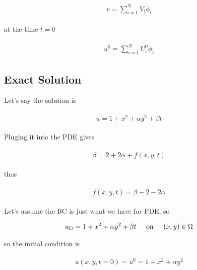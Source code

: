 \documentclass{article}
\begin{document}
	\begin{gather}
	\begin{split}
		v = \sum_{i=1}^{N}V_i\phi_i
	\end{split}
	\end{gather}
	
	at the time $t=0$
	
	\begin{gather}
	\begin{split}
	u^0 = \sum_{i=1}^{N}U^0_i\phi_i
	\end{split}
	\end{gather}
	
	
	
	\subsection*{Exact Solution}
	
	Let's say the solution is
	
	\begin{gather}
	\begin{split}
	u = 1 + x^2 + \alpha y^2 + \beta t
	\end{split}
	\end{gather}
	
	Pluging it into the PDE gives
	
	\begin{gather}
	\begin{split}
	 \beta = 2 + 2\alpha + f(x,y,t)
	\end{split}
	\end{gather}
	
	thus
	
	\begin{gather}
	\begin{split}
		f(x,y,t) = \beta - 2 - 2\alpha
	\end{split}
	\end{gather}
	
	Let's assume the BC is just what we have for PDE, so
	
	\begin{gather}
	\begin{split}
		u_\mathrm{D} = 1+x^2+\alpha y^2 + \beta t \hspace{5mm} \text{on} \hspace{5mm} (x,y)\in\Omega
	\end{split}
	\end{gather}
	
	so the initial condition is
	
	\begin{gather}
	\begin{split}
	u(x,y,t=0) = u^0 = 1+x^2+\alpha y^2
	\end{split}
	\end{gather}
	
	
	
\end{document}
